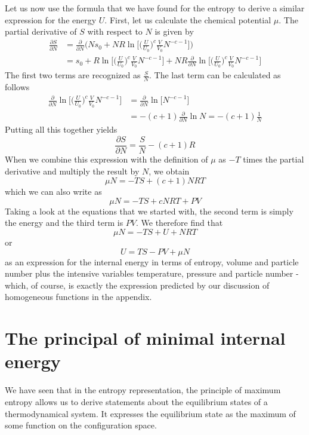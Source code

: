 \documentclass[a4paper, draft]{report}
\numberwithin{section}{chapter}
\numberwithin{equation}{chapter}
\theoremstyle{own}
\theoremstyle{remark}
\begin{document}
Let us now use the formula that we have found for the entropy to derive a similar expression for the energy $U$.
First, let us calculate the chemical potential $\mu$. The partial derivative of $S$ with respect to $N$ is given by
\begin{align*}
\frac{\partial S}{\partial N} &= \frac{\partial}{\partial N} \big( N s_0 + N R \ln \big[ \big( \frac{U}{U_0} \big)^c \frac{V}{V_0} N^{-c - 1}  \big]  \big)    \\
&= s_0 + R \ln \big[ \big( \frac{U}{U_0} \big)^c \frac{V}{V_0} N^{-c - 1}  \big] + N R \frac{\partial}{\partial N}  \ln \big[ \big( \frac{U}{U_0} \big)^c \frac{V}{V_0} N^{-c - 1}  \big]
\end{align*}
The first two terms are recognized as $\frac{S}{N}$. The last term can be calculated as follows
\begin{align*}
\frac{\partial}{\partial N}  \ln \big[ \big( \frac{U}{U_0} \big)^c \frac{V}{V_0} N^{-c - 1}  \big] &= 
\frac{\partial}{\partial N}   \ln \big[  N^{-c - 1}  \big] \\
&= -(c+1) \frac{\partial}{\partial N}   \ln N = - (c+1) \frac{1}{N}
\end{align*}
Putting all this together yields
$$
\frac{\partial S}{\partial N} = \frac{S}{N} - (c+1) R
$$
When we combine this expression with the definition of $\mu$ as $-T$ times the partial derivative and multiply the result by $N$, we obtain
$$
\mu N = - T S + (c+1) NRT
$$
which we can also write as
$$
\mu N = - T S + c NRT + PV
$$
Taking a look at the equations that we started with, the second term is simply the energy and the third term is $PV$. We therefore find that
$$
\mu N = - TS + U + NRT
$$
or 
$$
U = TS - PV + \mu N
$$
as an expression for the internal energy in terms of entropy, volume and particle number plus the intensive variables temperature, pressure and particle number - which, of course, is exactly the expression predicted by our discussion of homogeneous functions in the appendix.

\section{The principal of minimal internal energy}\label{sec:minimalinternalenergy}

We have seen that in the entropy representation, the principle of maximum entropy allows us to derive statements about the equilibrium states of a thermodynamical system. It expresses the equilibrium state as the maximum of some function on the configuration space.
\end{document}
